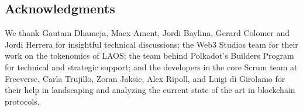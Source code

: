 \subsection{Acknowledgments}

We thank Gautam Dhameja, Maex Ament, Jordi Baylina, Gerard Colomer and Jordi Herrera
for insightful technical discussions;
the Web3 Studios team for their work on the tokenomics of LAOS; 
the team behind Polkadot's Builders Program for technical and
strategic support; and the developers in the core Scrum team
at Freeverse, Carla Trujillo, Zoran Jaksic, Alex Ripoll,
and Luigi di Girolamo for their help 
in landscaping and analyzing the current 
state of the art in blockchain protocols. 